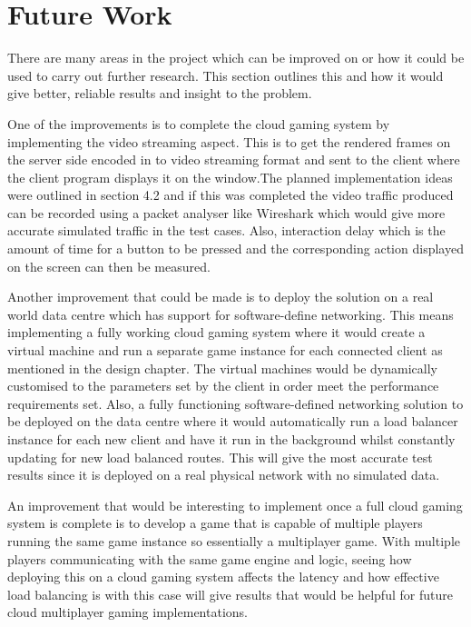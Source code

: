 \section{Future Work}
There are many areas in the project which can be improved on or how it could be used to carry out further research. This section outlines this and how it would give better, reliable results and insight to the problem.
\newline
\par
One of the improvements is to complete the cloud gaming system by implementing the video streaming aspect. This is to get the rendered frames on the server side encoded in to video streaming format and sent to the client where the client program displays it on the window.The planned implementation ideas were outlined in section 4.2 and if this was completed the video traffic produced can be recorded using a packet analyser like Wireshark which would give more accurate simulated traffic in the test cases. Also, interaction delay which is the amount of time for a button to be pressed and the corresponding action displayed on the screen can then be measured.
\newline
\par
Another improvement that could be made is to deploy the solution on a real world data centre which has support for software-define networking. This means implementing a fully working cloud gaming system where it would create a virtual machine and run a separate game instance for each connected client as mentioned in the design chapter. The virtual machines would be dynamically customised to the parameters set by the client in order meet the performance requirements set. Also, a fully functioning software-defined networking solution to be deployed on the data centre where it would automatically run a load balancer instance for each new client and have it run in the background whilst constantly updating for new load balanced routes. This will give the most accurate test results since it is deployed on a real physical network with no simulated data.
\newline
\par
An improvement that would be interesting to implement once a full cloud gaming system is complete is to develop a game that is capable of multiple players running the same game instance so essentially a multiplayer game. With multiple players communicating with the same game engine and logic, seeing how deploying this on a cloud gaming system affects the latency and how effective load balancing is with this case will give results that would be helpful for future cloud multiplayer gaming implementations.
